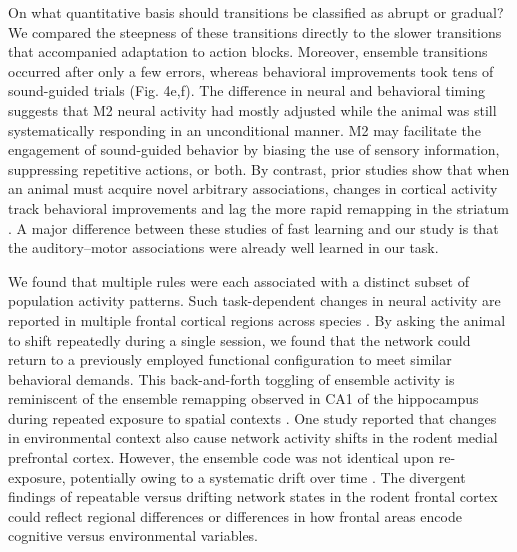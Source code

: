 On what quantitative basis should transitions be classified as abrupt or gradual? We compared the steepness of these transitions directly to the slower transitions that accompanied adaptation to action blocks. Moreover, ensemble transitions occurred after only a few errors, whereas behavioral improvements took tens of sound-guided trials (Fig. 4e,f). The difference in neural and behavioral timing suggests that M2 neural activity had mostly adjusted while the animal was still systematically responding in an unconditional manner. M2 may facilitate the engagement of sound-guided behavior by biasing the use of sensory information, suppressing repetitive actions, or both. By contrast, prior studies show that when an animal must acquire novel arbitrary associations, changes in cortical activity track behavioral improvements \citep{mitz1991learning,brasted2004comparison} and lag the more rapid remapping in the striatum \citep{pasupathy2005different}. A major difference between these studies of fast learning and our study is that the auditory–motor associations were already well learned in our task.

We found that multiple rules were each associated with a distinct subset of population activity patterns. Such task-dependent changes in neural activity are reported in multiple frontal cortical regions across species \citep{asaad2000task,rich2009rat,rodgers2014neural,durstewitz2010abrupt,wallis2001single}. By asking the animal to shift repeatedly during a single session, we found that the network could return to a previously employed functional configuration to meet similar behavioral demands. This back-and-forth toggling of ensemble activity is reminiscent of the ensemble remapping observed in CA1 of the hippocampus during repeated exposure to spatial contexts \citep{wills2005attractor,leutgeb2005independent}. One study reported that changes in environmental context also cause network activity shifts in the rodent medial prefrontal cortex. However, the ensemble code was not identical upon re-exposure, potentially owing to a systematic drift over time \citep{hyman2012contextual}. The divergent findings of repeatable versus drifting network states in the rodent frontal cortex could reflect regional differences or differences in how frontal areas encode cognitive versus environmental variables.

